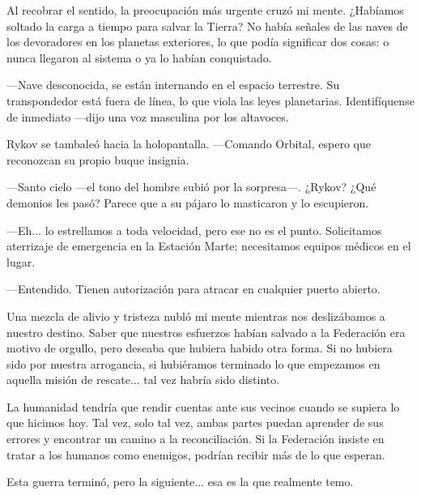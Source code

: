Al recobrar el sentido, la preocupación más urgente cruzó mi mente. ¿Habíamos soltado la carga a tiempo para salvar la Tierra? No había señales de las naves de los devoradores en los planetas exteriores, lo que podía significar dos cosas: o nunca llegaron al sistema o ya lo habían conquistado.

—Nave desconocida, se están internando en el espacio terrestre. Su transpondedor está fuera de línea, lo que viola las leyes planetarias. Identifíquense de inmediato —dijo una voz masculina por los altavoces.

Rykov se tambaleó hacia la holopantalla. —Comando Orbital, espero que reconozcan su propio buque insignia.

—Santo cielo —el tono del hombre subió por la sorpresa—. ¿Rykov? ¿Qué demonios les pasó? Parece que a su pájaro lo masticaron y lo escupieron.

—Eh... lo estrellamos a toda velocidad, pero ese no es el punto. Solicitamos aterrizaje de emergencia en la Estación Marte; necesitamos equipos médicos en el lugar.

—Entendido. Tienen autorización para atracar en cualquier puerto abierto.

Una mezcla de alivio y tristeza nubló mi mente mientras nos deslizábamos a nuestro destino. Saber que nuestros esfuerzos habían salvado a la Federación era motivo de orgullo, pero deseaba que hubiera habido otra forma. Si no hubiera sido por nuestra arrogancia, si hubiéramos terminado lo que empezamos en aquella misión de rescate... tal vez habría sido distinto.

La humanidad tendría que rendir cuentas ante sus vecinos cuando se supiera lo que hicimos hoy. Tal vez, solo tal vez, ambas partes puedan aprender de sus errores y encontrar un camino a la reconciliación. Si la Federación insiste en tratar a los humanos como enemigos, podrían recibir más de lo que esperan.

Esta guerra terminó, pero la siguiente... esa es la que realmente temo.